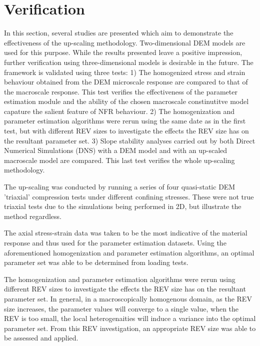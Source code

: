 \section{Verification}

In this section, several studies are presented which aim to demonstrate the effectiveness of the up-scaling methodology. Two-dimensional DEM models are used for this purpose. While the results presented leave a positive impression, further verification using three-dimensional models is desirable in the future. The framework is validated using three tests: 1) The homogenized stress and strain behaviour obtained from the DEM microscale response are compared to that of the macroscale response. This test verifies the effectiveness of the parameter estimation module and the ability of the chosen macroscale constinutitve model capature the salient feature of NFR behaviour. 2) The homogenization and parameter estimation algorithms were rerun using the same date as in the first test, but with different REV sizes to investigate the effects the REV size has on the resultant parameter set. 3) Slope stability analyses carried out by both Direct Numerical Simulations (DNS) with a DEM model and with an up-scaled macroscale model are compared. This last test verifies the whole up-scaling methodology.

 The up-scaling was conducted by running a series of four quasi-static DEM 'triaxial' compression tests under different confining stresses. These were not true triaxial tests due to the simulations being performed in 2D, but illustrate the method regardless.

The axial stress-strain data was taken to be the most indicative of the material response and thus used for the parameter estimation datasets. Using the aforementioned homogenization and parameter estimation algorithms, an optimal parameter set was able to be determined from loading tests.

The homogenization and parameter estimation algorithms were rerun using different REV sizes to investigate the effects the REV size has on the resultant parameter set. In general, in a macroscopically homogenous domain, as the REV size increases, the parameter values will converge to a single value, when the REV is too small, the local heterogenaities will induce a variance into the optimal parameter set. From this REV investigation, an appropriate REV size was able to be assessed and applied. 

